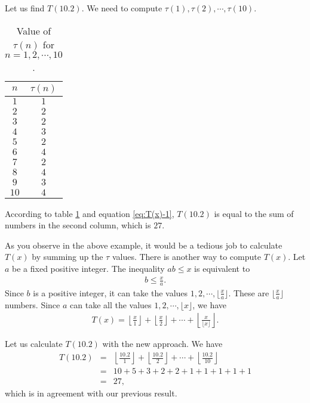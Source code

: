 \documentclass[12pt]{subfile}
\begin{document}
	\begin{example}
		Let us find $T(10.2)$. We need to compute $\tau(1), \tau(2), \cdots, \tau(10)$.
			\begin{table}
					\begin{center}
						\begin{tabular}{|c|c|}
							\hline
							$n$ & $\tau(n)$\\
							\hline
							$1$ & $1$\\
							\hline
							$2$ & $2$\\
							\hline
							$3$ & $2$\\
							\hline
							$4$ & $3$\\
							\hline
							$5$ & $2$\\
							\hline
							$6$ & $4$\\
							\hline
							$7$ & $2$\\
							\hline
							$8$ & $4$\\
							\hline
							$9$ & $3$\\
							\hline
							$10$ & $4$\\
							\hline
					\end{tabular}
					\caption{Value of $\tau(n)$ for $n=1,2,\cdots,10$.}\label{table:tau}
				\end{center}
			\end{table}
		According to table \ref{table:tau} and equation \ref{eq:T(x)-1}, $T(10.2)$ is equal to the sum of numbers in the second column, which is $27$.
	\end{example}


As you observe in the above example, it would be a tedious job to calculate $T(x)$ by summing up the $\tau$ values. There is another way to compute $T(x)$. Let $a$ be a fixed positive integer. The inequality $ab \leq x$ is equivalent to
	\begin{align*}
		b \leq \frac{x}{a}.
	\end{align*}
Since $b$ is a positive integer, it can take the values $1, 2, \cdots, \lfloor \frac{x}{a}\rfloor$. These are $\lfloor \frac{x}{a}\rfloor$ numbers. Since $a$ can take all the values $1, 2, \cdots, \lfloor x \rfloor$, we have
	\begin{align*}
		T(x) = \left\lfloor \frac{x}{1}\right\rfloor + \left\lfloor \frac{x}{2}\right\rfloor + \cdots + \left\lfloor \frac{x}{\lfloor x \rfloor}\right\rfloor.
	\end{align*}

	\begin{example}
		Let us calculate $T(10.2)$ with the new approach. We have
			\begin{eqnarray*}
				T(10.2) &=& \left\lfloor \frac{10.2}{1}\right\rfloor + \left\lfloor \frac{10.2}{2}\right\rfloor + \cdots + \left\lfloor \frac{10.2}{10}\right\rfloor\\
						&=& 10 + 5 + 3 + 2 + 2 + 1 + 1 + 1 + 1 + 1\\
						&=& 27,
			\end{eqnarray*}
		which is in agreement with our previous result.
	\end{example}
\end{document}
